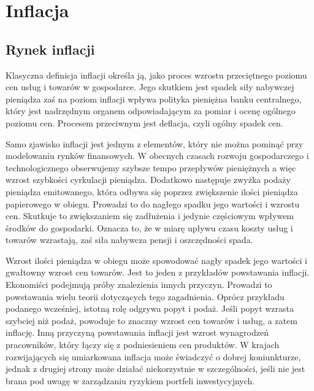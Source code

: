 \documentclass{mini}
\theoremstyle{mythstyle}
\begin{document}
%			
%		
%		
	
\chapter{Inflacja}
	
	\section{Rynek inflacji}
	
	Klasyczna definicja inflacji określa ją, jako proces wzrostu przeciętnego poziomu cen usług i towarów w gospodarce. Jego skutkiem jest spadek siły nabywczej pieniądza zaś na poziom inflacji wpływa polityka pieniężna banku centralnego, który jest nadrzędnym organem odpowiadającym za pomiar i ocenę ogólnego poziomu cen. Procesem przeciwnym jest deflacja, czyli ogólny spadek cen.
	
	Samo zjawisko inflacji jest jednym z elementów, który nie można pominąć przy modelowaniu rynków finansowych. W obecnych czasach rozwoju gospodarczego i technologicznego obserwujemy szybsze tempo przepływów pieniężnych a więc wzrost szybkości cyrkulacji pieniądza. Dodatkowo następuje zwyżka podaży pieniądza emitowanego, która odbywa się poprzez zwiększenie ilości pieniądza papierowego w obiegu. Prowadzi to do nagłego spadku jego wartości i wzrostu cen. Skutkuje to zwiększaniem się zadłużenia i jedynie częściowym wpływem środków do gospodarki. Oznacza to, że w miarę upływu czasu koszty usług i towarów wzrastają, zaś siła nabywcza pensji i oszczędności spada.
	
	Wzrost ilości pieniądza w obiegu może spowodować nagły spadek jego wartości i gwałtowny wzrost cen towarów. Jest to jeden z przykładów powstawania inflacji. Ekonomiści podejmują próby znalezienia innych przyczyn. Prowadzi to powstawania wielu teorii dotyczących tego zagadnienia. Oprócz przykładu podanego wcześniej, istotną rolę odgrywa popyt i podaż. Jeśli popyt wzrasta szybciej niż podaż, powoduje to znaczny wzrost cen towarów i usług, a zatem inflację. Inną przyczyną powstawania inflacji jest wzrost wynagrodzeń pracowników, który łączy się z podniesieniem cen produktów. W krajach rozwijających się umiarkowana inflacja może świadczyć o dobrej koniunkturze, jednak z drugiej strony może działać niekorzystnie w szczególności, jeśli nie jest brana pod uwagę w zarządzaniu ryzykiem portfeli inwestycyjnych.
	
\end{document}
